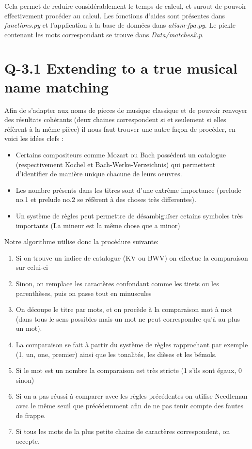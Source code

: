 \documentclass[10.5pt, oneside]{article}   	%
\begin{document}
Cela permet de reduire considérablement le temps de calcul, et surout de pouvoir effectivement procéder au calcul. Les fonctions d'aides sont présentes dans \textit{functions.py} et l'application à la base de données dans \textit{atiam-fpa.py}. Le pickle contenant les mots correspondant se trouve dans \textit{Data/matches2.p}.

\section{Q-3.1 Extending to a true musical name matching}

Afin de s'adapter aux noms de pieces de musique classique et de pouvoir renvoyer des résultats cohérants (deux chaines correspondent si et seulement si elles réfèrent à la même pièce) il nous faut trouver une autre façon de procéder, en voici les idées clefs :
\begin{itemize}
	\item Certains compositeurs comme Mozart ou Bach possédent un catalogue (respectivement Kochel et Bach-Werke-Verzeichnis) qui permettent d'identifier de manière unique chacune de leurs oeuvres.
	\item Les nombre présents dans les titres sont d'une extrême importance (prelude no.1 et prelude no.2 se réfèrent à des choses très differentes).
	\item Un système de règles peut permettre de désambiguïser cetains symboles très importants (La mineur est la même chose que a minor)
\end{itemize}

Notre algorithme utilise donc la procèdure suivante: 

\begin{enumerate}
	\item Si on trouve un indice de catalogue (KV ou BWV) on effectue la comparaison sur celui-ci
	\item Sinon, on remplace les caractères confondant comme les tirets ou les parenthèses, puis on passe tout en minuscules
	\item On découpe le titre par mots, et on procède à la comparaison mot à mot (dans tous le sens possibles mais un mot ne peut correspondre qu'à au plus un mot).
	\item La comparaison se fait à partir du système de règles rapprochant par exemple (1, un, one, premier) ainsi que les tonalités, les dièses et les bémols.
	\item Si le mot est un nombre la comparaison est très stricte (1 s'ils sont égaux, 0 sinon)
	\item Si on a pas réussi à comparer avec les règles précédentes on utilise Needleman avec le même seuil que précédemment afin de ne pas tenir compte des fautes de frappe.
	\item Si tous les mots de la plus petite chaine de caractères correspondent, on accepte.
\end{enumerate}
\end{document}
